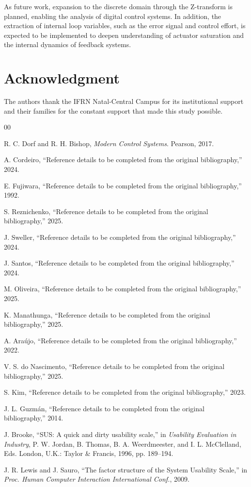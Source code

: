 \documentclass[conference]{IEEEtran}
\begin{document}
As future work, expansion to the discrete domain through the Z-transform is planned, enabling the analysis of digital control systems. In addition, the extraction of internal loop variables, such as the error signal and control effort, is expected to be implemented to deepen understanding of actuator saturation and the internal dynamics of feedback systems.

\section*{Acknowledgment}

The authors thank the IFRN Natal-Central Campus for its institutional support and their families for the constant support that made this study possible.

\begin{thebibliography}{00}

R. C. Dorf and R. H. Bishop, \textit{Modern Control Systems}. Pearson, 2017.

A. Cordeiro, ``Reference details to be completed from the original bibliography,'' 2024.

E. Fujiwara, ``Reference details to be completed from the original bibliography,'' 1992.

S. Reznichenko, ``Reference details to be completed from the original bibliography,'' 2025.

J. Sweller, ``Reference details to be completed from the original bibliography,'' 2024.

J. Santos, ``Reference details to be completed from the original bibliography,'' 2024.

M. Oliveira, ``Reference details to be completed from the original bibliography,'' 2025.

K. Manathunga, ``Reference details to be completed from the original bibliography,'' 2025.

A. Ara\'ujo, ``Reference details to be completed from the original bibliography,'' 2022.

V. S. do Nascimento, ``Reference details to be completed from the original bibliography,'' 2025.

S. Kim, ``Reference details to be completed from the original bibliography,'' 2023.

J. L. Guzm\'an, ``Reference details to be completed from the original bibliography,'' 2014.

J. Brooke, ``SUS: A quick and dirty usability scale,'' in \textit{Usability Evaluation in Industry}, P. W. Jordan, B. Thomas, B. A. Weerdmeester, and I. L. McClelland, Eds. London, U.K.: Taylor \& Francis, 1996, pp. 189--194.

J. R. Lewis and J. Sauro, ``The factor structure of the System Usability Scale,'' in \textit{Proc. Human Computer Interaction International Conf.}, 2009.

\end{thebibliography}
\end{document}
